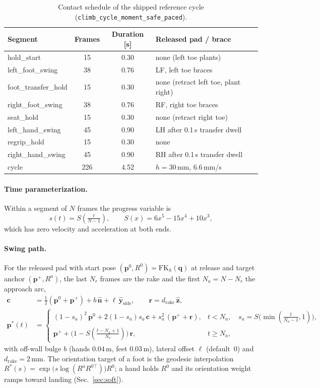 \documentclass[11pt]{article}
\newcommand{\nhat}{\hat{\bm n}}
\newcommand{\zhat}{\hat{\bm z}}
\begin{document}
\begin{table}[h]
\centering\small
\begin{tabular}{@{}lccl@{}}
\toprule
Segment & Frames & Duration [s] & Released pad / brace \\
\midrule
hold\_start & 15 & 0.30 & none (left toe plants) \\
left\_foot\_swing & 38 & 0.76 & LF, left toe braces \\
foot\_transfer\_hold & 15 & 0.30 & none (retract left toe, plant right) \\
right\_foot\_swing & 38 & 0.76 & RF, right toe braces \\
seat\_hold & 15 & 0.30 & none (retract right toe) \\
left\_hand\_swing & 45 & 0.90 & LH after 0.1\,s transfer dwell \\
regrip\_hold & 15 & 0.30 & none \\
right\_hand\_swing & 45 & 0.90 & RH after 0.1\,s transfer dwell \\
\midrule
cycle & 226 & 4.52 & $h=30$\,mm, $6.6$\,mm/s \\
\bottomrule
\end{tabular}
\caption{Contact schedule of the shipped reference cycle
(\texttt{climb\_cycle\_moment\_safe\_paced}).}
\label{tab:segments}
\end{table}

\paragraph{Time parameterization.} Within a segment of $N$ frames the
progress variable is
\begin{equation}
  s(t)=S\!\left(\tfrac{t}{N-1}\right),\qquad S(x)=6x^5-15x^4+10x^3,
\end{equation}
which has zero velocity and acceleration at both ends.

\paragraph{Swing path.} For the released pad with start pose
$(\bm p^0,R^0)=\mathrm{FK}_h(\bm q)$ at release and target anchor
$(\bm p^+,R^a)$, the last $N_r$ frames are the rake and the first
$N_a=N-N_r$ the approach arc,
\begin{align}
  \bm c &= \tfrac12(\bm p^0+\bm p^+)+b\,\nhat+\ell\,\hat{\bm y}_{\mathrm{side}},
  \qquad \bm r=d_{\mathrm{rake}}\,\zhat,\\
  \bm p^*(t) &=
  \begin{cases}
    (1-s_a)^2\,\bm p^0+2(1-s_a)s_a\,\bm c+s_a^2\,(\bm p^++\bm r), &
    t<N_a,\quad s_a=S\!\bigl(\min(\tfrac{t}{N_a-1},1)\bigr),\\[2pt]
    \bm p^++\bigl(1-S(\tfrac{t-N_a+1}{N_r})\bigr)\,\bm r, & t\ge N_a,
  \end{cases}
\end{align}
with off-wall bulge $b$ (hands $0.04$\,m, feet $0.03$\,m), lateral offset
$\ell$ (default~0) and $d_{\mathrm{rake}}=2$\,mm. The orientation target of a
foot is the geodesic interpolation
$R^*(s)=\exp\!\bigl(s\log(R^aR^{0\top})\bigr)R^0$; a hand holds $R^0$ and
its orientation weight ramps toward landing (Sec.~\ref{sec:soft}).
\end{document}
